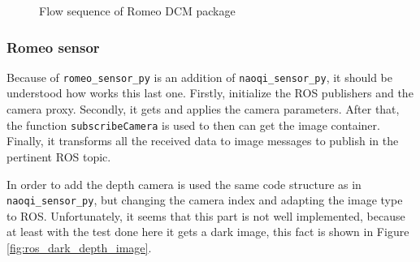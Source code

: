 \documentclass[12pt,a4paper,final,twoside,openright]{report}
\begin{document}
\begin{figure}[h]
\centering

\caption{Flow sequence of Romeo DCM package\label{fig:dcm_driver_flow}}
\end{figure}

\subsubsection{Romeo sensor}


Because of \texttt{romeo\_sensor\_py} is an addition of \texttt{naoqi\_sensor\_py}, it should be understood how works this last one. Firstly, initialize the ROS publishers and the camera proxy. Secondly, it gets and applies the camera parameters. After that, the function \texttt{subscribeCamera} is used to then can get the image container. Finally, it transforms all the received data to image messages to publish in the pertinent ROS topic. 

In order to add the depth camera is used the same code structure as in \texttt{naoqi\_sensor\_py}, but changing the camera index and adapting the image type to ROS. Unfortunately, it seems that this part is not well implemented, because at least with the test done here it gets a dark image, this fact is shown in Figure \ref{fig:ros_dark_depth_image}.  
\end{document}
